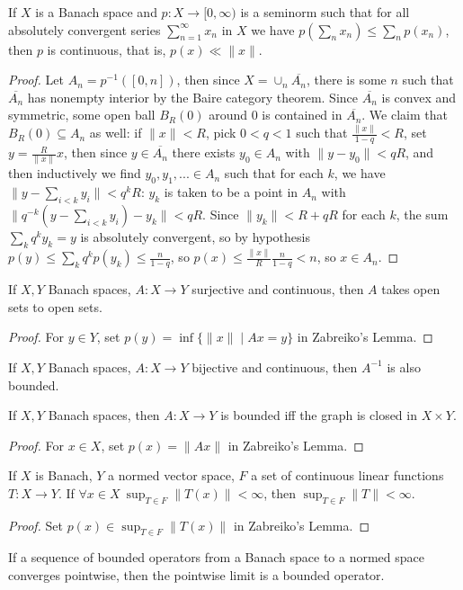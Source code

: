 \begin{lem} If $X$ is a Banach space and $p : X \rightarrow [0,\infty)$ is a seminorm such that for all absolutely convergent series $\sum_{n=1}^\infty x_n$ in $X$ we have $p(\sum_n x_n) \le \sum_n p(x_n)$, then $p$ is continuous, that is, $p(x) \ll \|x\|$.
\end{lem}
\begin{proof} Let $A_n = p^{-1}([0,n])$, then since $X = \cup_n \overline{A_n}$, there is some $n$ such that $\overline{A_n}$ has nonempty interior by the Baire category theorem. Since $\overline{A_n}$ is convex and symmetric, some open ball $B_R(0)$ around $0$ is contained in $\overline{A_n}$. We claim that $B_R(0) \subseteq A_n$ as well: if $\|x\| < R$, pick $0 < q < 1$ such that $\frac{\|x\|}{1-q} < R$, set $y = \frac{R}{\|x\|}x$, then since $y \in \overline{A_n}$ there exists $y_0 \in A_n$ with $\|y - y_0\| < qR$, and then inductively we find $y_0, y_1, ... \in A_n$ such that for each $k$, we have $\|y - \sum_{i<k} y_i\| < q^kR$: $y_k$ is taken to be a point in $A_n$ with $\|q^{-k}(y - \sum_{i<k} y_i) - y_k\| < qR$. Since $\|y_k\| < R + qR$ for each $k$, the sum $\sum_k q^k y_k = y$ is absolutely convergent, so by hypothesis $p(y) \le \sum_k q^kp(y_k) \le \frac{n}{1-q}$, so $p(x) \le \frac{\|x\|}{R}\frac{n}{1-q} < n$, so $x \in A_n$.
\end{proof}

\begin{thm} If $X,Y$ Banach spaces, $A:X\rightarrow Y$ surjective and continuous, then $A$ takes open sets to open sets.
\end{thm}
\begin{proof} For $y \in Y$, set $p(y) = \inf \{\|x\| \mid Ax = y\}$ in Zabreiko's Lemma.
\end{proof}

\begin{thm} If $X,Y$ Banach spaces, $A:X\rightarrow Y$ bijective and continuous, then $A^{-1}$ is also bounded.
\end{thm}

\begin{thm} If $X, Y$ Banach spaces, then $A:X\rightarrow Y$ is bounded iff the graph is closed in $X\times Y$.
\end{thm}
\begin{proof} For $x \in X$, set $p(x) = \|Ax\|$ in Zabreiko's Lemma.
\end{proof}

\begin{thm} If $X$ is Banach, $Y$ a normed vector space, $F$ a set of continuous linear functions $T:X\rightarrow Y$. If $\forall x \in X\ \sup_{T\in F} \|T(x)\| < \infty$, then $\sup_{T \in F} \|T\| < \infty$.
\end{thm}
\begin{proof} Set $p(x) \in \sup_{T\in F} \|T(x)\|$ in Zabreiko's Lemma.
\end{proof}

\begin{cor} If a sequence of bounded operators from a Banach space to a normed space converges pointwise, then the pointwise limit is a bounded operator.
\end{cor}
